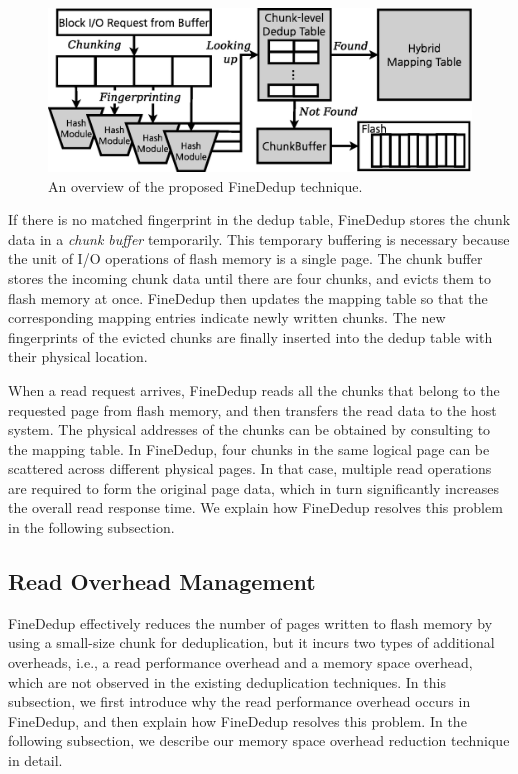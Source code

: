 \begin{figure}[t]
	\center
	\includegraphics[scale=0.4]{figure/finededup/overview}
	\caption{An overview of the proposed FineDedup technique.} %
	\label{fig:overview}
\end{figure}

If there is no matched fingerprint in the dedup table,
FineDedup stores the chunk data in a \textit{chunk buffer} temporarily.
This temporary buffering is necessary 
because the unit of I/O operations of flash memory is a single page.
The chunk buffer stores the incoming chunk data until there are four chunks,
and evicts them to flash memory at once.
FineDedup then updates the mapping table 
so that the corresponding mapping entries indicate newly written chunks.
The new fingerprints of the evicted chunks are finally inserted into the dedup table with their physical location.

When a read request arrives,
FineDedup reads all the chunks that belong to the requested page from flash memory,
and then transfers the read data to the host system.
The physical addresses of the chunks can be obtained by consulting to the mapping table.
In FineDedup, four chunks in the same logical page can be scattered across different physical pages.
In that case, multiple read operations are required to form the original page data,
which in turn significantly increases the overall read response time.
We explain how FineDedup resolves this problem in the following subsection.

\subsection{Read Overhead Management}
\label{sec:finededup_readoverheadmanagement}

FineDedup effectively reduces the number of pages written to flash memory
by using a small-size chunk for deduplication,
but it incurs two types of additional overheads, i.e.,
a read performance overhead and a memory space overhead,
which are not observed in the existing deduplication techniques.
In this subsection, 
we first introduce why the read performance overhead occurs in FineDedup,
and then explain how FineDedup resolves this problem.
In the following subsection, 
we describe our memory space overhead reduction technique in detail.

